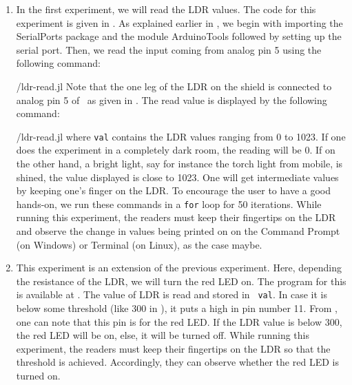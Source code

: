 \begin{enumerate}
  \item In the first experiment, we will read the LDR values. The code for this experiment is given in
        . As explained earlier in , we begin with importing the SerialPorts 
        \cite{julia-serial-ports} package and the module ArduinoTools followed by setting up the serial port.
        Then, we read the input coming from analog pin 5 using the 
        following command:
        
        {\LocLDRjuliacode/ldr-read.jl} Note that the one leg of the LDR on
        the shield is connected to analog pin 5 of \arduino\, 
        as given in . The read value is displayed 
        by the following command: 
        
        {\LocLDRjuliacode/ldr-read.jl} where {\tt val} contains
        the LDR values ranging from 0 to 1023. If one does the experiment in a completely dark room, the
        reading will be 0. If on the other hand, a bright light, say for instance the torch
        light from mobile, is shined, the value displayed is close to 1023. One will get
        intermediate values by keeping one's finger on the LDR. To
        encourage the user to have a good hands-on, we run these commands in
        a {\tt for} loop for 50 iterations. While running this experiment, the readers must keep their fingertips on the LDR and
        observe the change in values being printed on on the
        Command Prompt (on Windows) or Terminal (on Linux), as the case maybe.
        
        
  \item This experiment is an extension of the previous experiment. Here, depending the resistance of the LDR, we will
        turn the red LED on.  The program for this is available at
        .  The value of LDR is read and stored in {\tt
            val}.  In case it is below some threshold (like 300 in ), 
        it puts a high in pin number 11. From , 
        one can note that this pin is for the red LED.  If the LDR value is below 300, 
        the red LED will be on, else, it will be turned off.  
        While running this experiment, the readers 
        must keep their fingertips on the LDR so that the threshold is achieved. Accordingly, 
        they can observe whether the red LED is turned on. 
\end{enumerate}

